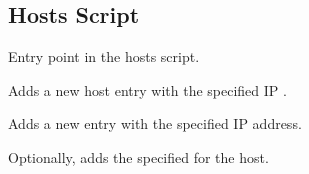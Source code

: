 \subsection{Hosts Script}




Entry point in the hosts script.


Adds a new host entry with the specified IP .


Adds a new  entry with the specified IP address.


Optionally, adds the specified  for the host.


